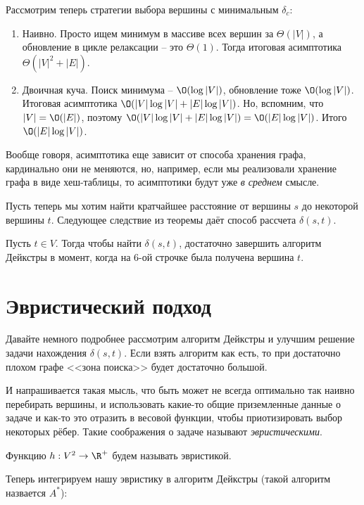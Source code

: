 Рассмотрим теперь стратегии выбора вершины с минимальным $\delta_c$:
\begin{enumerate}
    \item Наивно. Просто ищем минимум в массиве всех вершин за $\Theta(|V|)$, а обновление в цикле релаксации -- это $\Theta(1)$. Тогда итоговая асимптотика $\Theta\left(|V|^2 + |E|\right)$.
    \item Двоичная куча. Поиск минимума -- $\O(\log |V|)$, обновление тоже $\O(\log |V|)$. Итоговая асимптотика $\O(|V| \log |V| + |E| \log |V|)$. Но, вспомним, что $|V| = \O(|E|)$, поэтому $\O(|V| \log |V| + |E| \log |V|) = \O(|E| \log |V|)$. Итого $\O(|E| \log |V|)$.
\end{enumerate}

\Note Вообще говоря, асимптотика еще зависит от способа хранения графа, кардинально они не меняются, но, например, если мы реализовали хранение графа в виде хеш-таблицы, то асимптотики будут уже \textit{в среднем} смысле.

Пусть теперь мы хотим найти кратчайшее расстояние от вершины $s$ до некоторой вершины $t$. Следующее следствие из теоремы даёт способ рассчета $\delta(s, t)$.

\Cons Пусть $t \in V$. Тогда чтобы найти $\delta(s, t)$, достаточно завершить алгоритм Дейкстры в момент, когда на 6-ой строчке была получена вершина $t$.

\section{Эвристический подход}

Давайте немного подробнее рассмотрим алгоритм Дейкстры и улучшим решение задачи нахождения $\delta(s, t)$. Если взять алгоритм как есть, то при достаточно плохом графе <<зона поиска>> будет достаточно большой.

И напрашивается такая мысль, что быть может не всегда оптимально так наивно перебирать вершины, и использовать какие-то общие приземленные данные о задаче и как-то это отразить в весовой функции, чтобы приотизировать выбор некоторых рёбер. Такие соображения о задаче называют \textit{эвристическими}.

\Def Функцию $h: V^2 \to \R^+$ будем называть эвристикой.

Теперь интегрируем нашу эвристику в алгоритм Дейкстры (такой алгоритм назвается $A^*$):

